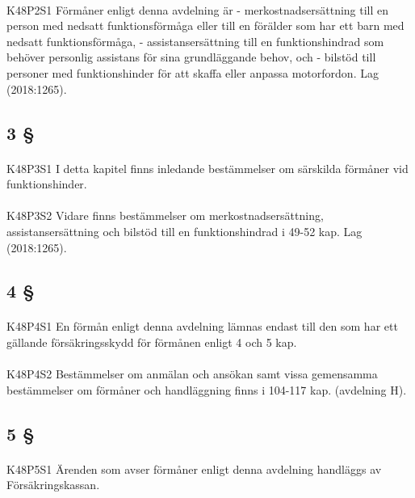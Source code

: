 \documentclass[a4paper,notitlepage,openany,10pt]{book}
\begin{document}
\paragraph*{}
{\tiny K48P2S1}
Förmåner enligt denna avdelning är
\newline - merkostnadsersättning till en person med nedsatt funktionsförmåga eller till en förälder som har ett barn med nedsatt funktionsförmåga,
\newline - assistansersättning till en funktionshindrad som behöver personlig assistans för sina grundläggande behov, och
\newline - bilstöd till personer med funktionshinder för att skaffa eller anpassa motorfordon.
Lag (2018:1265).
\subsection*{3 §}
\paragraph*{}
{\tiny K48P3S1}
I detta kapitel finns inledande bestämmelser om särskilda förmåner vid funktionshinder.
\paragraph*{}
{\tiny K48P3S2}
Vidare finns bestämmelser om merkostnadsersättning, assistansersättning och bilstöd till en funktionshindrad i 49-52 kap.
Lag (2018:1265).
\subsection*{4 §}
\paragraph*{}
{\tiny K48P4S1}
En förmån enligt denna avdelning lämnas endast till den som har ett gällande försäkringsskydd för förmånen enligt 4 och 5 kap.
\paragraph*{}
{\tiny K48P4S2}
Bestämmelser om anmälan och ansökan samt vissa gemensamma bestämmelser om förmåner och handläggning finns i 104-117 kap. (avdelning H).
\subsection*{5 §}
\paragraph*{}
{\tiny K48P5S1}
Ärenden som avser förmåner enligt denna avdelning handläggs av Försäkringskassan.
\end{document}
